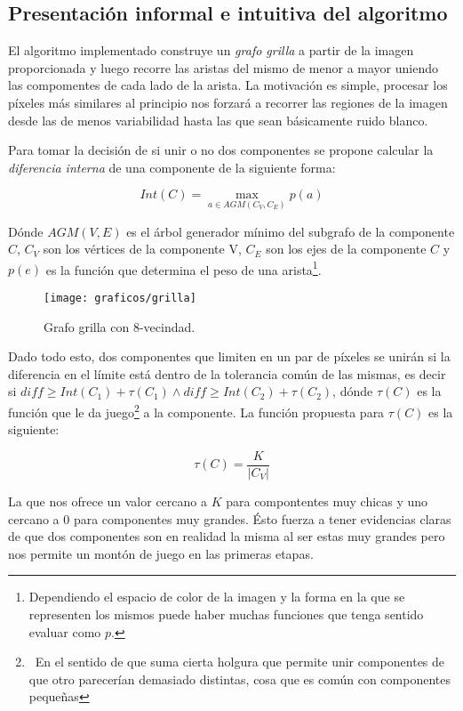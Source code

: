 \subsection{Presentación informal e intuitiva del algoritmo}

El algoritmo implementado construye un \emph{grafo grilla} a partir de la
imagen proporcionada y luego recorre las aristas del mismo de menor a mayor
uniendo las compomentes de cada lado de la arista. La motivación es simple,
procesar los píxeles más similares al principio nos forzará a recorrer las
regiones de la imagen desde las de menos variabilidad hasta las que sean
básicamente ruido blanco.

Para tomar la decisión de si unir o no dos componentes se propone calcular la
\emph{diferencia interna} de una componente de la siguiente forma:

\[Int(C) = \max_{a \in AGM(C_V, C_E)} p(a)\]

Dónde $AGM(V, E)$ es el árbol generador mínimo del subgrafo de la componente
$C$, $C_V$ son los vértices de la componente V, $C_E$ son los ejes de la
componente $C$ y $p(e)$ es la función que determina el peso de una
arista\footnote{Dependiendo el espacio de color de la imagen y la forma en la
que se representen los mismos puede haber muchas funciones que tenga sentido
evaluar como $p$.}.

\begin{figure}[h]
	\centering
	\texttt{[image: graficos/grilla]}
	\caption{Grafo grilla con 8-vecindad.}
\end{figure}

Dado todo esto, dos componentes que limiten en un par de píxeles se unirán si
la diferencia en el límite está dentro de la tolerancia común de las mismas, es
decir si $\textit{diff} \geq Int(C_1) + \tau(C_1) \land \textit{diff} \geq
Int(C_2) + \tau(C_2)$, dónde $\tau(C)$ es la función que le da juego\footnote{\
En el sentido de que suma cierta holgura que permite unir componentes de que
otro parecerían demasiado distintas, cosa que es común con componentes
pequeñas} a la componente. La función propuesta para $\tau(C)$ es la siguiente:

\[\tau(C) = \frac{K}{|C_V|}\]

La que nos ofrece un valor cercano a $K$ para compontentes muy chicas y uno
cercano a $0$ para componentes muy grandes. Ésto fuerza a tener evidencias
claras de que dos componentes son en realidad la misma al ser estas muy grandes
pero nos permite un montón de juego en las primeras etapas.

